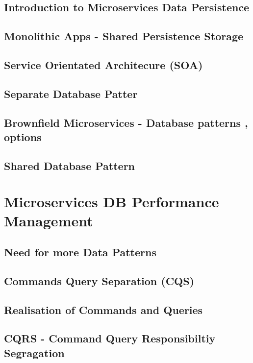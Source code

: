 \documentclass[a4paper, 11pt]{book}
\begin{document}
    \section{Introduction to Microservices Data Persistence}


    \section{Monolithic Apps - Shared Persistence Storage}


    \section{Service Orientated Architecure (SOA)}


    \section{Separate Database Patter}


    \section{Brownfield Microservices - Database patterns , options}


    \section{Shared Database Pattern}


    \chapter{Microservices DB Performance Management}


    \section{Need for more Data Patterns}


    \section{Commands Query Separation (CQS)}


    \section{Realisation of Commands and Queries}


    \section{CQRS - Command Query Responsibiltiy Segragation}
\end{document}
